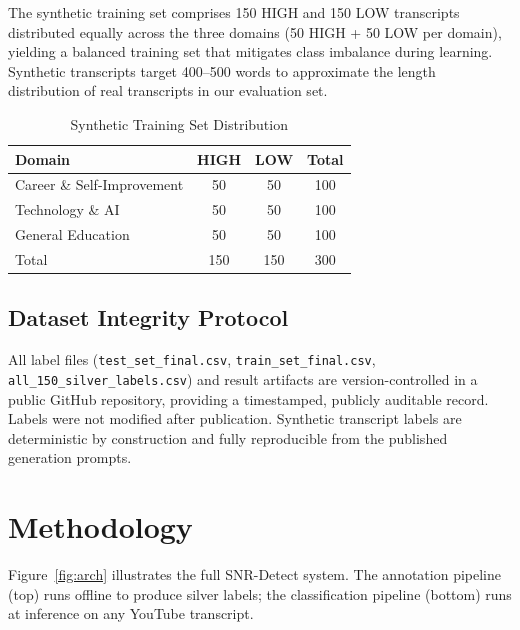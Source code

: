 \documentclass[11pt,a4paper]{article}
\begin{document}
The synthetic training set comprises 150 HIGH and 150 LOW transcripts distributed equally
across the three domains (50 HIGH + 50 LOW per domain), yielding a balanced training set that
mitigates class imbalance during learning. Synthetic transcripts target 400--500 words to
approximate the length distribution of real transcripts in our evaluation set.

\begin{table}[h]
\centering
\caption{Synthetic Training Set Distribution}
\label{tab:synthetic}
\begin{tabular}{lccc}
\toprule
Domain & HIGH & LOW & Total \\
\midrule
Career \& Self-Improvement & 50 & 50 & 100 \\
Technology \& AI & 50 & 50 & 100 \\
General Education & 50 & 50 & 100 \\
\midrule
Total & 150 & 150 & 300 \\
\bottomrule
\end{tabular}
\end{table}

\subsection{Dataset Integrity Protocol}

All label files (\texttt{test\_set\_final.csv}, \texttt{train\_set\_final.csv},
\texttt{all\_150\_silver\_labels.csv}) and result artifacts are version-controlled in a public
GitHub repository, providing a timestamped, publicly auditable record. Labels were not modified
after publication. Synthetic transcript labels are deterministic by construction and fully
reproducible from the published generation prompts.

\section{Methodology}

Figure~\ref{fig:arch} illustrates the full SNR-Detect system. The annotation pipeline (top)
runs offline to produce silver labels; the classification pipeline (bottom) runs at inference
on any YouTube transcript.
\end{document}
